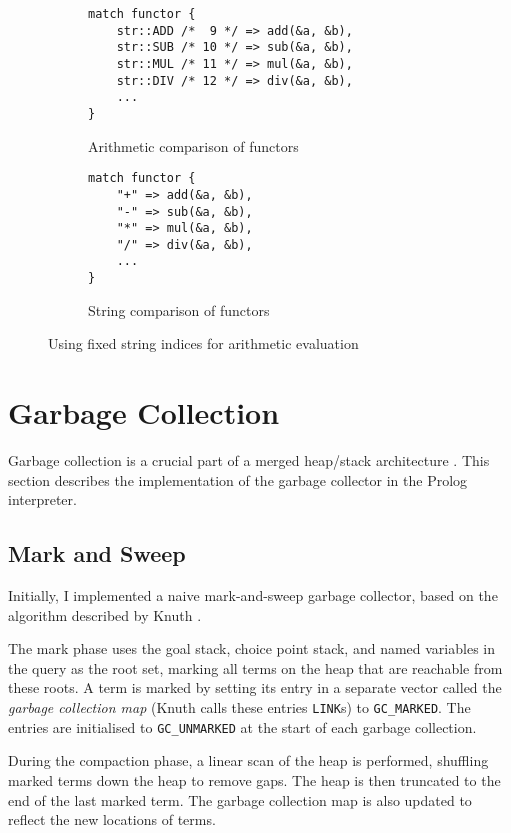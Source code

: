 \begin{figure}[H]
\centering
\begin{subfigure}{.5\textwidth}
\centering
\begin{verbatim}
match functor {
    str::ADD /*  9 */ => add(&a, &b),
    str::SUB /* 10 */ => sub(&a, &b),
    str::MUL /* 11 */ => mul(&a, &b),
    str::DIV /* 12 */ => div(&a, &b),
    ...
}
\end{verbatim}
\caption{Arithmetic comparison of functors}
\end{subfigure}%
\begin{subfigure}{.5\textwidth}
\centering
\begin{verbatim}
match functor {
    "+" => add(&a, &b),
    "-" => sub(&a, &b),
    "*" => mul(&a, &b),
    "/" => div(&a, &b),
    ...
}
\end{verbatim}
\caption{String comparison of functors}
\end{subfigure}
\caption{Using fixed string indices for arithmetic evaluation}
\label{fig:fixed-string-indices}
\end{figure}

\section{Garbage Collection}

\label{sec:gc-impl}

Garbage collection is a crucial part of a merged heap/stack architecture \cite{liEfficientMemoryManagement2000}. This section describes the implementation of the garbage collector in the Prolog interpreter.

\subsection{Mark and Sweep}

Initially, I implemented a naive mark-and-sweep garbage collector, based on the algorithm described by Knuth \cite{knuthArtComputerProgramming1997}.

The mark phase uses the goal stack, choice point stack, and named variables in the query as the root set, marking all terms on the heap that are reachable from these roots. A term is marked by setting its entry in a separate vector called the \emph{garbage collection map} (Knuth calls these entries \texttt{LINK}s) to \texttt{GC\_MARKED}. The entries are initialised to \texttt{GC\_UNMARKED} at the start of each garbage collection.

During the compaction phase, a linear scan of the heap is performed, shuffling marked terms down the heap to remove gaps. The heap is then truncated to the end of the last marked term. The garbage collection map is also updated to reflect the new locations of terms.

